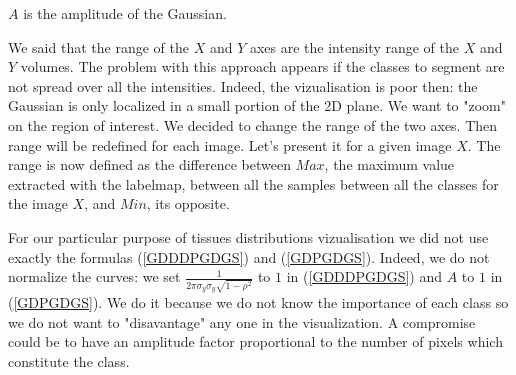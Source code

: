 $A$ is the amplitude of the Gaussian.
\par
We said that the range of the $X$ and $Y$ axes are the intensity range of the $X$ and $Y$ volumes. The problem with this approach appears if the classes to segment are not spread over all the intensities. Indeed, the vizualisation is poor then: the Gaussian is only localized in a small portion of the 2D plane. We want to "zoom" on the region of interest. We decided to change the range of the two axes. Then range will be redefined for each image. Let's present it for a given image $X$. The range is now defined as the difference between $Max$, the maximum value extracted with the labelmap, between all the samples between all the classes for the image $X$, and $Min$, its opposite.
\par
For our particular purpose of tissues distributions vizualisation we did not use exactly the formulas (\ref{GDDDPGDGS}) and (\ref{GDPGDGS}). Indeed, we do not normalize the curves: we set $\frac{1}{2 \pi \sigma_y \sigma_y \sqrt{1-\rho^2}}$ to $1$ in (\ref{GDDDPGDGS}) and $A$ to $1$ in (\ref{GDPGDGS}). We do it because we do not know the importance of each class so we do not want to "disavantage" any one in the visualization. A compromise could be to have an amplitude factor proportional to the number of pixels which constitute the class.
